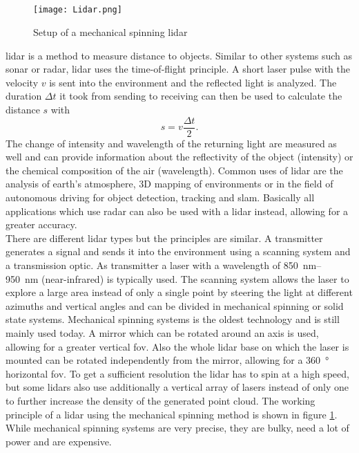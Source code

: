 \subsection{}
\begin{figure}[htb]
	\centering
	\texttt{[image: Lidar.png]}
	\caption{Setup of a mechanical spinning \acrshort{lidar} \cite{Li2020}}
	\label{fig:lidar}
\end{figure}
\acrfull{lidar} is a method to measure distance to objects.
Similar to other systems such as \acrfull{sonar} or \acrfull{radar}, \acrshort{lidar} uses the time-of-flight principle.
A short laser pulse with the velocity $v$ is sent into the environment and the reflected light is analyzed.
The duration $\Delta t$ it took from sending to receiving can then be used to calculate the distance $s$ with
\[ s = v\frac{\Delta t}{2}. \]
The change of intensity and wavelength of the returning light are measured as well and can provide information about the reflectivity of the object (intensity) or the chemical composition of the air (wavelength).
Common uses of \acrshort{lidar} are the analysis of earth's atmosphere, 3D mapping of environments or in the field of autonomous driving for object detection, tracking and \acrshort{slam}.
Basically all applications which use \acrshort{radar} can also be used with a \acrshort{lidar} instead, allowing for a greater accuracy.\\
There are different \acrshort{lidar} types but the principles are similar.
A transmitter generates a signal and sends it into the environment using a scanning system and a transmission optic.
As transmitter a laser with a wavelength of \SIrange{850}{950}{\nano\metre} (near-infrared) is typically used.
The scanning system allows the laser to explore a large area instead of only a single point by steering the light at different azimuths and vertical angles and can be divided in mechanical spinning or solid state systems.
Mechanical spinning systems is the oldest technology and is still mainly used today.
A mirror which can be rotated around an axis is used, allowing for a greater vertical \acrfull{fov}.
Also the whole \acrshort{lidar} base on which the laser is mounted can be rotated independently from the mirror, allowing for a \SI{360}{\degree} horizontal \acrshort{fov}.
To get a sufficient resolution the \acrshort{lidar} has to spin at a high speed, but some \acrshort{lidar}s also use additionally a vertical array of lasers instead of only one to further increase the density of the generated point cloud.
The working principle of a \acrshort{lidar} using the mechanical spinning method is shown in figure \ref{fig:lidar}.
While mechanical spinning systems are very precise, they are bulky, need a lot of power and are expensive.

